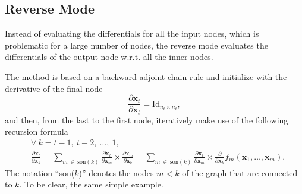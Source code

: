 \subsection{Reverse Mode}

Instead of evaluating the differentials for all the input nodes, which
is problematic for a large number of nodes, the reverse mode evaluates
the differentials of the output node w.r.t. all the inner nodes.

The method is based on a backward adjoint chain rule and initialize with
the derivative of the final node
\[
  \frac{\partial\mathbf{x}_{t}}{\partial\mathbf{x}_{t}} =
  \text{Id}_{n_{t} \times n_{t}},
\]
and then, from the last to the first node, iteratively make use of the
following recursion formula
\begin{align*}
  &\forall~k = t - 1,~t - 2,~\dots,~1,\\
  &\frac{\partial\mathbf{x}_{t}}{\partial\mathbf{x}_{k}} =
    \sum_{m~\in~\text{son}(k)}
    \frac{\partial\mathbf{x}_{t}}{\partial\mathbf{x}_{m}}\times
    \frac{\partial\mathbf{x}_{m}}{\partial\mathbf{x}_{k}} =
    \sum_{m~\in~\text{son}(k)}
    \frac{\partial\mathbf{x}_{t}}{\partial\mathbf{x}_{m}}\times
    \frac{\partial}{\partial\mathbf{x}_{k}}
    f_{m}(\mathbf{x}_{1}, \dots, \mathbf{x}_{m}).
\end{align*}
The notation ``son(\(k\))'' denotes the nodes \(m < k\) of the graph
that are connected to \(k\). To be clear, the same simple example.

